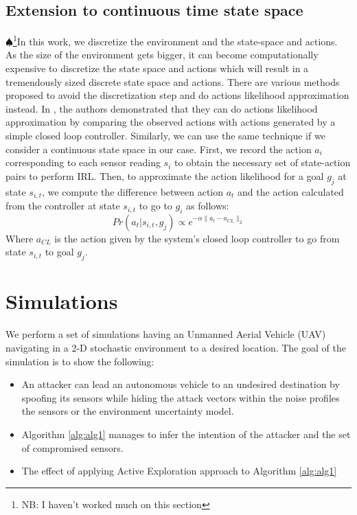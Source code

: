 \documentclass[letterpaper, 10 pt, conference]{ieeeconf}  %
\newcommand\NB[1]{$\spadesuit$\footnote{NB: #1}}
\begin{document}
\subsection{Extension to continuous time state space}
\NB{I haven't worked much on this section}In this work, we discretize the environment and the state-space and actions. As the size of the environment gets bigger, it can become computationally expensive to discretize the state space and actions which will result in a tremendously sized discrete state space and actions. There are various methods proposed to avoid the discretization step and do actions likelihood approximation instead. In \cite{Michini2013}, the authors demonstrated that they can do actions likelihood approximation by comparing the observed actions with actions generated by a simple closed loop controller. Similarly, we can use the same technique if we consider a continuous state space in our case. First, we record the action $a_i$ corresponding to each sensor reading $s_i$ to obtain the necessary set of state-action pairs to perform IRL. Then, to approximate the action likelihood for a goal $g_j$ at state $s_{i,t}$, we compute the difference between action $a_t$ and the action calculated from the controller at state $s_{i,t}$ to go to $g_i$ as follows:
\begin{equation}
 Pr(a_t|s_{i,t},g_j) \propto e^{-\alpha \lVert a_t - a_{CL} \rVert_{2}}
\end{equation}
Where $a_{CL}$ is the action given by the system's closed loop controller to go from state $s_{i,t}$ to goal $g_j$.
\section{Simulations}\label{sec:simulations}
We perform a set of simulations having an Unmanned Aerial Vehicle (UAV) navigating in a 2-D stochastic environment to a desired location. The goal of the simulation is to show the following:
\begin{itemize}
    \item An attacker can lead an autonomous vehicle to an undesired destination by spoofing its sensors while hiding the attack vectors within the noise profiles the sensors or the environment uncertainty model.
    \item Algorithm \ref{alg:alg1} manages to infer the intention of the attacker and the set of compromised sensors.
    \item The effect of applying Active Exploration approach to Algorithm \ref{alg:alg1}
\end{itemize}
\end{document}
